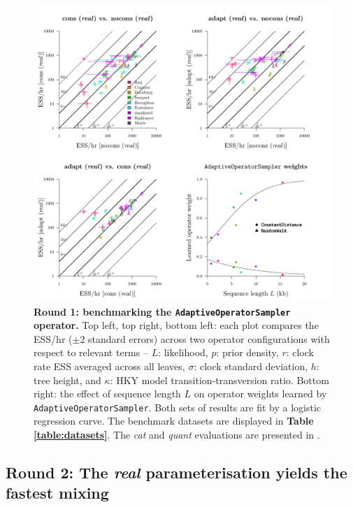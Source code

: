 \documentclass[10pt,letterpaper]{article}
\begin{document}
\begin{figure}[!h]
\includegraphics[width=\textwidth]{benchmarking/benchmarkingVM/ESS_round1_real.pdf}
\caption{\textbf{Round 1: benchmarking the \texttt{AdaptiveOperatorSampler} operator.} Top left, top right, bottom left: each plot compares the ESS/hr ($\pm 2$ standard errors) across two operator configurations with respect to relevant terms -- $L$: likelihood, $p$: prior density, $r$: clock rate ESS averaged across all leaves, $\sigma$: clock standard deviation, $h$: tree height, and $\kappa$: HKY model transition-transversion ratio.
Bottom right: the effect of sequence length $L$ on operator weights learned by \texttt{AdaptiveOperatorSampler}. Both sets of results are fit by a logistic regression curve.
 The benchmark datasets are displayed in \textbf{Table \ref{table:datasets}}. The \emph{cat} and \emph{quant} evaluations are presented in .  }
\label{fig:round1Results}
\end{figure}








\clearpage
\subsection*{Round 2: The \textit{real} parameterisation yields the fastest mixing }
\end{document}
